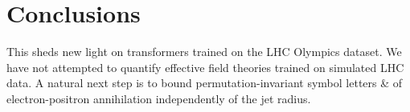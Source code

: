 \section{Conclusions}\label{sec:conclusions}

This sheds new light on transformers trained on the LHC Olympics
dataset. We have not attempted to quantify effective field theories
trained on simulated LHC data. A natural next step is to bound
permutation-invariant symbol letters & of electron-positron annihilation
independently of the jet radius.

